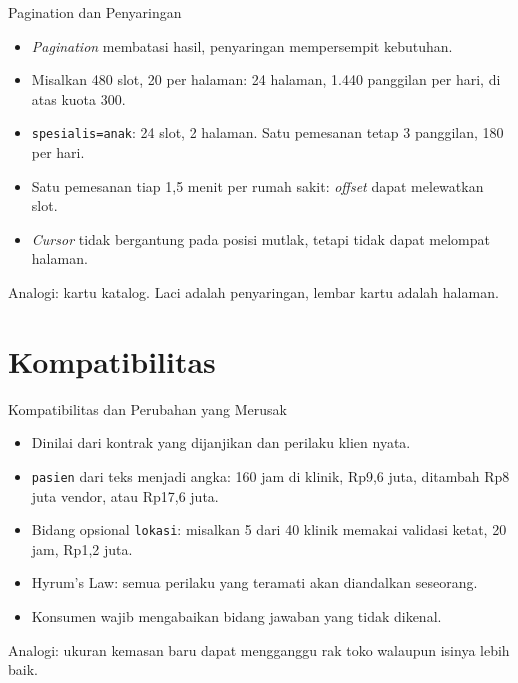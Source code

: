 \documentclass[aspectratio=169, table, 12pt]{beamer}
\begin{document}
\begin{frame}{{\Large Pagination dan Penyaringan}}
  \vspace{8pt}
  \begin{itemize}
    \item \textit{Pagination} membatasi hasil, penyaringan mempersempit kebutuhan.
    \item Misalkan 480 slot, 20 per halaman: 24 halaman, 1.440 panggilan per hari, di atas kuota 300.
    \item \texttt{spesialis=anak}: 24 slot, 2 halaman. Satu pemesanan tetap 3 panggilan, 180 per hari.
    \item Satu pemesanan tiap 1,5 menit per rumah sakit: \textit{offset} dapat melewatkan slot.
    \item \textit{Cursor} tidak bergantung pada posisi mutlak, tetapi tidak dapat melompat halaman.
  \end{itemize}
  \vspace{6pt}
  {\small Analogi: kartu katalog. Laci adalah penyaringan, lembar kartu adalah halaman.}
\end{frame}

\section{Kompatibilitas}

\begin{frame}{{\Large Kompatibilitas dan Perubahan yang Merusak}}
  \vspace{8pt}
  \begin{itemize}
    \item Dinilai dari kontrak yang dijanjikan dan perilaku klien nyata.
    \item \texttt{pasien} dari teks menjadi angka: 160 jam di klinik, Rp9,6 juta, ditambah Rp8 juta vendor, atau Rp17,6 juta.
    \item Bidang opsional \texttt{lokasi}: misalkan 5 dari 40 klinik memakai validasi ketat, 20 jam, Rp1,2 juta.
    \item Hyrum's Law: semua perilaku yang teramati akan diandalkan seseorang.
    \item Konsumen wajib mengabaikan bidang jawaban yang tidak dikenal.
  \end{itemize}
  \vspace{6pt}
  {\small Analogi: ukuran kemasan baru dapat mengganggu rak toko walaupun isinya lebih baik.}
\end{frame}
\end{document}
